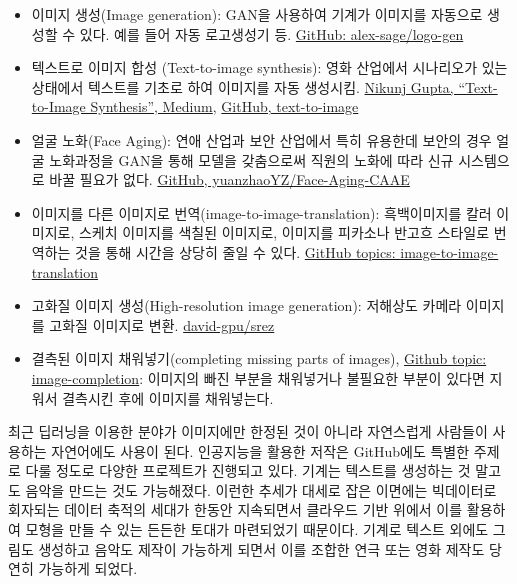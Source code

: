 \documentclass[smallextended]{svjour3}       %
\providecommand{\tightlist}{%
  \setlength{\itemsep}{0pt}\setlength{\parskip}{0pt}}
\begin{document}
\begin{itemize}
\tightlist
\item
  이미지 생성(Image generation): GAN을 사용하여 기계가 이미지를 자동으로
  생성할 수 있다. 예를 들어 자동 로고생성기 등.
  \href{https://github.com/alex-sage/logo-gen}{GitHub:
  alex-sage/logo-gen}
\item
  텍스트로 이미지 합성 (Text-to-image synthesis): 영화 산업에서
  시나리오가 있는 상태에서 텍스트를 기초로 하여 이미지를 자동 생성시킴.
  \href{https://medium.com/datadriveninvestor/text-to-image-synthesis-6e5de1bf86ec}{Nikunj
  Gupta, ``Text-to-Image Synthesis'', Medium},
  \href{https://github.com/crisbodnar/text-to-image}{GitHub,
  text-to-image}
\item
  얼굴 노화(Face Aging): 연애 산업과 보안 산업에서 특히 유용한데 보안의
  경우 얼굴 노화과정을 GAN을 통해 모델을 갖춤으로써 직원의 노화에 따라
  신규 시스템으로 바꿀 필요가 없다.
  \href{https://github.com/yuanzhaoYZ/Face-Aging-CAAE}{GitHub,
  yuanzhaoYZ/Face-Aging-CAAE}
\item
  이미지를 다른 이미지로 번역(image-to-image-translation): 흑백이미지를
  칼러 이미지로, 스케치 이미지를 색칠된 이미지로, 이미지를 피카소나
  반고흐 스타일로 번역하는 것을 통해 시간을 상당히 줄일 수 있다.
  \href{https://github.com/topics/image-to-image-translation}{GitHub
  topics: image-to-image-translation}
\item
  고화질 이미지 생성(High-resolution image generation): 저해상도 카메라
  이미지를 고화질 이미지로 변환.
  \href{https://github.com/david-gpu/srez}{david-gpu/srez}
\item
  결측된 이미지 채워넣기(completing missing parts of images),
  \href{https://github.com/topics/image-completion}{Github topic:
  image-completion}: 이미지의 빠진 부분을 채워넣거나 불필요한 부분이
  있다면 지워서 결측시킨 후에 이미지를 채워넣는다.
\end{itemize}

최근 딥러닝을 이용한 분야가 이미지에만 한정된 것이 아니라 자연스럽게
사람들이 사용하는 자연어에도 사용이 된다. 인공지능을 활용한 저작은
GitHub에도 특별한 주제로 다룰 정도로 다양한 프로젝트가 진행되고 있다.
기계는 텍스트를 생성하는 것 말고도 음악을 만드는 것도 가능해졌다. 이런한
추세가 대세로 잡은 이면에는 빅데이터로 회자되는 데이터 축적의 세대가
한동안 지속되면서 클라우드 기반 위에서 이를 활용하여 모형을 만들 수 있는
든든한 토대가 마련되었기 때문이다. 기계로 텍스트 외에도 그림도 생성하고
음악도 제작이 가능하게 되면서 이를 조합한 연극 또는 영화 제작도 당연히
가능하게 되었다.
\end{document}
